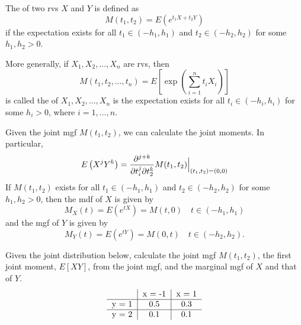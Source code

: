 \documentclass[notoc,notitlepage]{tufte-book}
\begin{document}
\begin{defn}
\label{defn:joint_moment_generating_functions}
  The  of two rvs $X$ and $Y$ is defined as
  \begin{equation*}
    M( t_1, t_2 ) = E\left( e^{t_1 X + t_2 Y} \right)
  \end{equation*}
  if the expectation exists for all $t_1 \in (-h_1, h_1)$ and $t_2 \in (-h_2, h_2)$ for some $h_1, h_2 > 0$.

  More generally, if $X_1, X_2, ..., X_n$ are rvs, then
  \begin{equation*}
    M( t_1, t_2, ..., t_n ) = E \left[ \exp\left( \sum_{i=1}^{n} t_i X_i \right) \right]
  \end{equation*}
  is called the  of $X_1, X_2, ..., X_n$ is the expectation exists for all $t_i \in (-h_i, h_i)$ for some $h_i > 0$, where $i = 1, ..., n$.
\end{defn}

\begin{defn}
\label{defn:joint_moments_and_marginal_mgf}
  Given the joint mgf $M(t_1, t_2)$, we can calculate the joint moments. In particular,
  \begin{equation*}
    E\left( X^j Y^k \right) = \frac{\partial^{j + k}}{\partial t_i^j \partial t_2^k} M(t_1, t_2) \Big|_{( t_1, t_2 ) = (0, 0)}^{}
  \end{equation*}
  If $M(t_1, t_2)$ exists for all $t_1 \in (-h_1, h_1)$ and $t_2 \in (-h_2, h_2)$ for some $h_1, h_2 > 0$, then the mdf of $X$ is given by
  \begin{equation*}
    M_X(t) = E \left( e^{tX} \right) = M(t, 0) \quad t \in (-h_1, h_1)
  \end{equation*}
  and the mgf of $Y$ is given by
  \begin{equation*}
    M_Y(t) = E \left( e^{tY} \right) = M(0, t) \quad t \in (-h_2, h_2).
  \end{equation*}
\end{defn}

\begin{eg}[Example 3.25]\label{eg:3_25}
  Given the joint distribution below, calculate the joint mgf $M(t_1, t_2)$, the first joint moment, $E[XY]$, from the joint mgf, and the marginal mgf of $X$ and that of $Y$.
  \[
  \begin{tabular}{c | c | c}
          & x = -1 & x = 1 \\
    \hline
    y = 1 & 0.5    & 0.3 \\
    \hline
    y = 2 & 0.1    & 0.1
  \end{tabular}
  \]
\end{eg}
\end{document}
